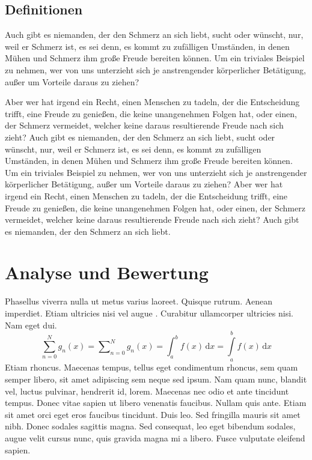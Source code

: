 \documentclass[paper=a4,fontsize=12pt,ngerman]{scrartcl}
\begin{document}
\subsection{Definitionen}
Auch gibt es niemanden, der den Schmerz an sich liebt, sucht oder wünscht, 
nur, weil er Schmerz ist, es sei denn, es kommt zu zufälligen Umständen, in 
denen Mühen und Schmerz ihm große Freude bereiten können. Um ein triviales 
Beispiel zu nehmen, wer von uns unterzieht sich je anstrengender körperlicher 
Betätigung, außer um Vorteile daraus zu ziehen?

Aber wer hat irgend ein Recht, einen Menschen zu tadeln, der die Entscheidung 
trifft, eine Freude zu genießen, die keine unangenehmen Folgen hat, oder 
einen, der Schmerz vermeidet, welcher keine daraus resultierende Freude nach 
sich zieht? Auch gibt es niemanden, der den Schmerz an sich liebt, sucht oder 
wünscht, nur, weil er Schmerz ist, es sei denn, es kommt zu zufälligen 
Umständen, in denen Mühen und Schmerz ihm große Freude bereiten können. Um 
ein triviales Beispiel zu nehmen, wer von uns unterzieht sich je 
anstrengender körperlicher Betätigung, außer um Vorteile daraus zu ziehen? 
Aber wer hat irgend ein Recht, einen Menschen zu tadeln, der die Entscheidung 
trifft, eine Freude zu genießen, die keine unangenehmen Folgen hat, oder 
einen, der Schmerz vermeidet, welcher keine daraus resultierende Freude nach 
sich zieht? Auch gibt es niemanden, der den Schmerz an sich liebt.

\section{Analyse und Bewertung}
Phasellus viverra nulla ut metus varius laoreet. Quisque rutrum. Aenean 
imperdiet. Etiam ultricies nisi vel augue \cite{ab94}. Curabitur ullamcorper 
ultricies nisi. Nam eget dui. 
\begin{equation}
  \sum_{n=0}^N g_n(x) = \sum\nolimits_{n=0}^N g_n(x) =
  \int_a^b f(x) \,\mbox{d}x = \int\limits_a^b f(x) \,\mbox{d}x 
\end{equation}
Etiam rhoncus. Maecenas tempus, tellus eget condimentum rhoncus, sem quam 
semper libero, sit amet adipiscing sem neque sed ipsum. Nam quam nunc, 
blandit vel, luctus pulvinar, hendrerit id, lorem. Maecenas nec odio et ante 
\cite{ah2006} tincidunt tempus. Donec vitae sapien ut libero venenatis 
faucibus. Nullam quis ante. Etiam sit amet orci eget eros faucibus tincidunt. 
Duis leo. Sed fringilla mauris sit amet nibh. Donec sodales sagittis magna. 
Sed consequat, leo eget bibendum sodales, augue velit cursus nunc, quis 
gravida magna mi a libero. Fusce vulputate eleifend sapien.
\end{document}
